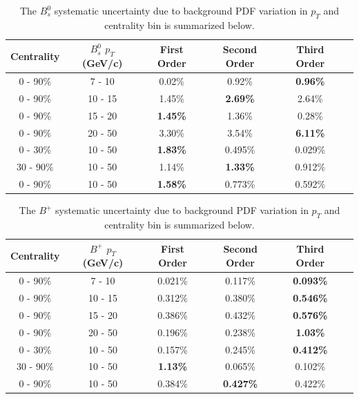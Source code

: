 \begin{table}[h]
\begin{center}
\caption{The $B^0_s$ systematic uncertainty due to background PDF variation in $p_T$ and centrality bin is summarized below.}
\vspace{1em}
\label{BsBkgdVarTable}
  \begin{tabular}{| c | c |c | c| c| c| }
    \hline
     Centrality & $B^0_s$ $p_T$ (GeV/c) & First Order & Second Order  &  Third Order \\
    \hline
    \hline
0 - 90\% & 7 - 10 &   0.02\%  &  0.92\% & \textbf{0.96\%}  \\ 
0 - 90\% & 10 - 15 & 1.45\%  & \textbf{2.69\%}  & 2.64\% \\ 
0 - 90\% & 15 - 20 &  \textbf{1.45\% }  & 1.36\%   &  0.28\%\\ 
0 - 90\% & 20 - 50 &  3.30\%   & 3.54\%  &  \textbf{6.11\%}  \\ 
0 - 30\% & 10 - 50  & \textbf{1.83\%}  & 0.495\%  &0.029\%  \\ 
30 - 90\% & 10 - 50 &  1.14\% &   \textbf{1.33\%}  & 0.912\% \\ 
0 - 90\% & 10 - 50 &  \textbf{1.58\%}   & 0.773\%  & 0.592\% \\ 
    \hline
    \hline
\end{tabular}
\end{center}
\end{table}



\begin{table}[h]
\begin{center}
\caption{The $B^+$ systematic uncertainty due to background PDF variation in $p_T$ and centrality bin is summarized below.}
\vspace{1em}
\label{BPBkgdVarTable}
  \begin{tabular}{| c | c |c | c| c| c| }
    \hline
     Centrality & $B^+$ $p_T$ (GeV/c) & First Order & Second Order  &  Third Order \\
    \hline
    \hline
0 - 90\% & 7 - 10 &   0.021\%  &  0.117\% & \textbf{0.093\%} \\ 
0 - 90\% & 10 - 15 & 0.312\%  & 0.380\%  & \textbf{0.546\%} \\ 
0 - 90\% & 15 - 20 &  0.386\% & 0.432\%   &  \textbf{0.576\%} \\ 
0 - 90\% & 20 - 50 &  0.196\%  & 0.238\%  &  \textbf{1.03\%} \\ 
0 - 30\% & 10 - 50  & 0.157\%  & 0.245\%  & \textbf{0.412\%}  \\ 
30 - 90\% & 10 - 50 &  \textbf{1.13\%} &   0.065\%  & 0.102\% \\ 
0 - 90\% & 10 - 50 &  0.384\%   & \textbf{0.427\%}  & 0.422\% \\ 
    \hline
    \hline
\end{tabular}
\end{center}
\end{table}



